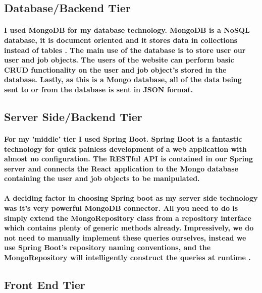 \subsection{Database/Backend Tier}
\paragraph{I used MongoDB for my database technology. MongoDB is a NoSQL database, it is document oriented and it stores data in collections instead of tables \cite{parker2013comparing}.
The main use of the database is to store user our user and job objects. The users of the website can perform basic CRUD functionality on the user and job object's stored in the database. Lastly, as this is a Mongo database, all of the data being sent to or from the database is sent in JSON format.}

\subsection{Server Side/Backend Tier}
\paragraph{For my 'middle' tier I used Spring Boot. Spring Boot is a fantastic technology for quick painless development of a web application with almost no configuration. The RESTful API is contained in our Spring server and connects the React application to the Mongo database containing the user and job objects to be manipulated.}
\paragraph{A deciding factor in choosing Spring boot as my server side technology was it's very powerful MongoDB connector. All you need to do is simply extend the MongoRepository class from a repository interface which contains plenty of generic methods already. Impressively, we do not need to manually implement these queries ourselves, instead we use Spring Boot's repository naming conventions, and the MongoRepository will intelligently construct the queries at runtime \cite{marchioni2015mongodb}.}

\subsection{Front End Tier}
